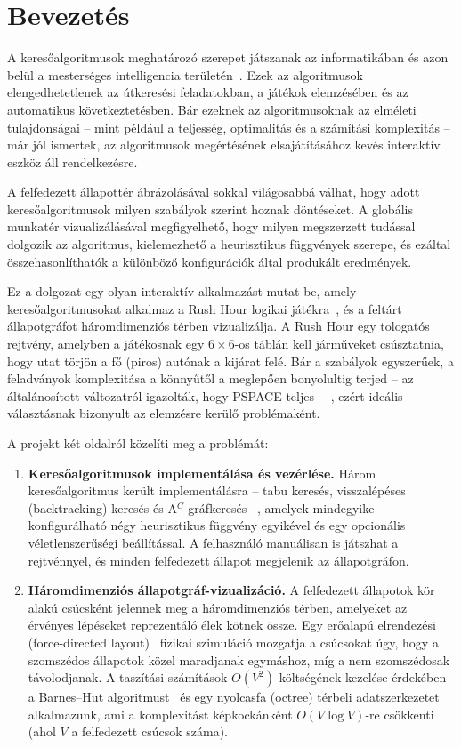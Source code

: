 \chapter{Bevezetés}
\label{ch:intro}

A keresőalgoritmusok meghatározó szerepet játszanak az informatikában és azon belül a mesterséges intelligencia területén~\cite{russellnorvig2020}. Ezek az algoritmusok elengedhetetlenek az útkeresési feladatokban, a játékok elemzésében és az automatikus következtetésben. Bár ezeknek az algoritmusoknak az elméleti tulajdonságai -- mint például a teljesség, optimalitás és a számítási komplexitás -- már jól ismertek, az algoritmusok megértésének elsajátításához kevés interaktív eszköz áll rendelkezésre.

A felfedezett állapottér ábrázolásával sokkal világosabbá válhat, hogy adott keresőalgoritmusok milyen szabályok szerint hoznak döntéseket. A globális munkatér vizualizálásával megfigyelhető, hogy milyen megszerzett tudással dolgozik az algoritmus, kielemezhető a heurisztikus függvények szerepe, és ezáltal összehasonlíthatók a különböző konfigurációk által produkált eredmények.

Ez a dolgozat egy olyan interaktív alkalmazást mutat be, amely keresőalgoritmusokat alkalmaz a Rush Hour logikai játékra~\cite{rushhour_puzzle}, és a feltárt állapotgráfot háromdimenziós térben vizualizálja. A Rush Hour egy tologatós rejtvény, amelyben a játékosnak egy $6 \times 6$-os táblán kell járműveket csúsztatnia, hogy utat törjön a fő (piros) autónak a kijárat felé. Bár a szabályok egyszerűek, a feladványok komplexitása a könnyűtől a meglepően bonyolultig terjed -- az általánosított változatról igazolták, hogy PSPACE-teljes~\cite{flake2002rush} --, ezért ideális választásnak bizonyult az elemzésre kerülő problémaként.

A projekt két oldalról közelíti meg a problémát:

\begin{enumerate}
    \item \textbf{Keresőalgoritmusok implementálása és vezérlése.} Három keresőalgoritmus került implementálásra -- tabu keresés, visszalépéses (backtracking) keresés és A$^C$ gráfkeresés --, amelyek mindegyike konfigurálható négy heurisztikus függvény egyikével és egy opcionális véletlenszerűségi beállítással. A felhasználó manuálisan is játszhat a rejtvénnyel, és minden felfedezett állapot megjelenik az állapotgráfon.
    \item \textbf{Háromdimenziós állapotgráf-vizualizáció.} A felfedezett állapotok kör alakú csúcsként jelennek meg a háromdimenziós térben, amelyeket az érvényes lépéseket reprezentáló élek kötnek össze. Egy erőalapú elrendezési (force-directed layout)~\cite{fruchterman1991graph} fizikai szimuláció mozgatja a csúcsokat úgy, hogy a szomszédos állapotok közel maradjanak egymáshoz, míg a nem szomszédosak távolodjanak. A taszítási számítások $O(V^2)$ költségének kezelése érdekében a Barnes--Hut algoritmust~\cite{barneshut1986} és egy nyolcasfa (octree) térbeli adatszerkezetet alkalmazunk, ami a komplexitást képkockánként $O(V \log V)$-re csökkenti (ahol $V$ a felfedezett csúcsok száma).
\end{enumerate}

